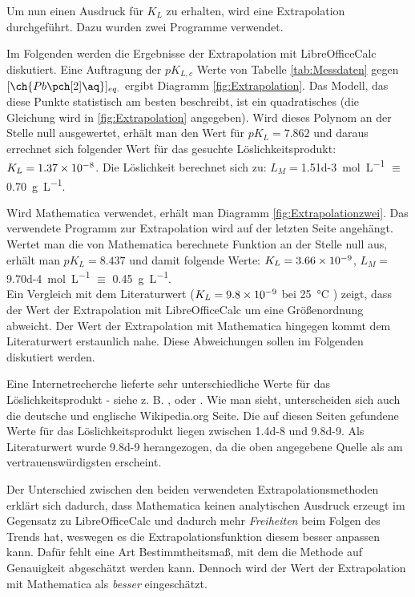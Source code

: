 \documentclass{article}
\begin{document}
    Um nun einen Ausdruck für $K_{L}$ zu erhalten, wird eine Extrapolation durchgeführt. Dazu wurden zwei Programme verwendet. 
    
    Im Folgenden werden die Ergebnisse der Extrapolation mit LibreOfficeCalc \cite{LibreOffice} diskutiert. Eine Auftragung der $pK_{L,c}$ Werte von Tabelle \ref{tab:Messdaten} gegen $[\ch{Pb\pch[2]\aq}]_{eq.}$ ergibt Diagramm \ref{fig:Extrapolation}. Das Modell, das diese Punkte statistisch am besten beschreibt, ist ein quadratisches (die Gleichung wird in \ref{fig:Extrapolation} angegeben). Wird dieses Polynom an der Stelle null ausgewertet, erhält man den Wert für $pK_{L}=7.862$ und daraus errechnet sich folgender Wert für das gesuchte Löslichkeitsprodukt: $K_{L}=\num{1.37d-8}$. Die Löslichkeit berechnet sich zu: $L_{M} = $\SI[mode=text, separate-uncertainty]{1.51d-3}{\mole\per\liter} $\equiv$ \SI[mode=text, separate-uncertainty]{0.70}{\gram\per\liter}. 
    
    Wird Mathematica \cite{Mathematica} verwendet, erhält man Diagramm \ref{fig:Extrapolationzwei}. Das verwendete Programm zur Extrapolation wird auf der letzten Seite angehängt. Wertet man die von Mathematica berechnete Funktion an der Stelle null aus, erhält man $pK_{L}=8.437$ und damit folgende Werte: $K_{L}=\num{3.66d-9}$, $L_{M} = $\SI[mode=text, separate-uncertainty]{9.70d-4}{\mole\per\liter} $\equiv$ \SI[mode=text, separate-uncertainty]{0.45}{\gram\per\liter}. \\
    
    Ein Vergleich mit dem Literaturwert ($K_{L}=\num{9.8d-9}$ bei \SI[mode=text]{25}{\degreeCelsius} \cite[S. 8-819]{solubilityConstants}) zeigt, dass der Wert der Extrapolation mit LibreOfficeCalc um eine Größenordnung abweicht. Der Wert der Extrapolation mit Mathematica hingegen kommt dem Literaturwert erstaunlich nahe. Diese Abweichungen sollen im Folgenden diskutiert werden. 
    
    Eine Internetrecherche lieferte sehr unterschiedliche Werte für das Löslichkeitsprodukt - siehe z. B. \cite{solubitliyWikizwei}, \cite{solubilityWikipedia} oder \cite{solubilityOtherOne}. Wie man sieht, unterscheiden sich auch die deutsche und englische Wikipedia.org Seite. Die auf diesen Seiten gefundene Werte für das Löslichkeitsprodukt liegen zwischen \num{1.4d-8} und \num{9.8d-9}. Als Literaturwert wurde \num{9.8d-9} herangezogen, da die oben angegebene Quelle als am vertrauenswürdigsten erscheint. 
    
    Der Unterschied zwischen den beiden verwendeten Extrapolationsmethoden erklärt sich dadurch, dass Mathematica keinen analytischen Ausdruck erzeugt im Gegensatz zu LibreOfficeCalc und dadurch mehr \textit{Freiheiten} beim Folgen des Trends hat, weswegen es die Extrapolationsfunktion diesem besser anpassen kann. Dafür fehlt eine Art Bestimmtheitsmaß, mit dem die Methode auf Genauigkeit abgeschätzt werden kann. Dennoch wird der Wert der Extrapolation mit Mathematica als \textit{besser} eingeschätzt. \\
    
\end{document}
